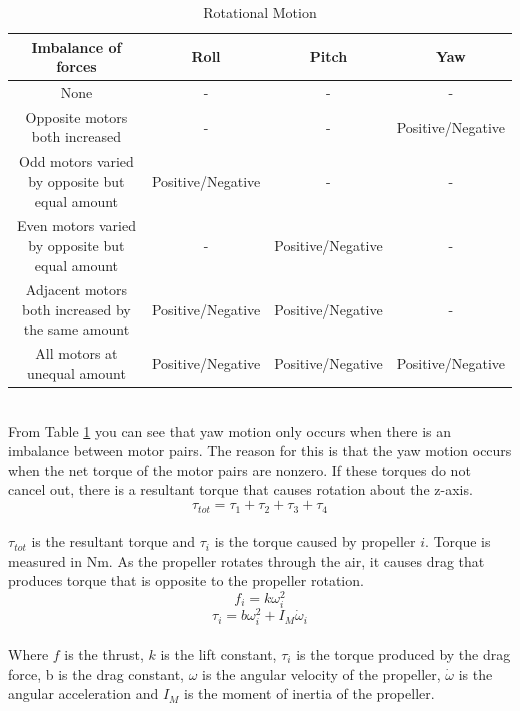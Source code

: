 \begin{table}[h]
\centering
\begin{tabular}{ |c|c|c|c| } 
 \hline
 \textbf{Imbalance of forces} & \textbf{Roll} & \textbf{Pitch} & \textbf{Yaw} \\
 \hline
 None & - & - & - \\ 
 Opposite motors both increased & - & - & Positive/Negative \\ 
 Odd motors varied by opposite but equal amount & Positive/Negative & - & - \\ 
 Even motors varied by opposite but equal amount & - & Positive/Negative & - \\ 
 Adjacent motors both increased by the same amount & Positive/Negative & Positive/Negative & - \\ 
 All motors at unequal amount & Positive/Negative & Positive/Negative & Positive/Negative \\ 
 \hline
\end{tabular}
\caption{Rotational Motion}
\label{tabular:rotmot}
\end{table} \\
\noindent
From Table \ref{tabular:rotmot} you can see that yaw motion only occurs when there is an imbalance between motor pairs. The reason for this is that the yaw motion occurs when the net torque of the motor pairs are nonzero. If these torques do not cancel out, there is a resultant torque that causes rotation about the z-axis. 
\begin{equation}
\tau_{tot} = \tau_1 + \tau_2 + \tau_3 + \tau_4
\end{equation}
\\
$\tau_{tot}$ is the resultant torque and $\tau_i$ is the torque caused by propeller $i$. Torque is measured in Nm. As the propeller rotates through the air, it causes drag that produces torque that is opposite to the propeller rotation. 
\begin{equation}
f_i = k\omega_i^2
\end{equation}
\begin{equation}
\tau_i = b\omega_i^2 + I_M\dot{\omega}_i
\end{equation}
\\
Where $f$ is the thrust, $k$ is the lift constant, $\tau_i$ is the torque produced by the drag force, b is the drag constant, $\omega$ is the angular velocity of the propeller, $\dot{\omega}$ is the angular acceleration and $I_M$ is the moment of inertia of the propeller. 
\\\\

